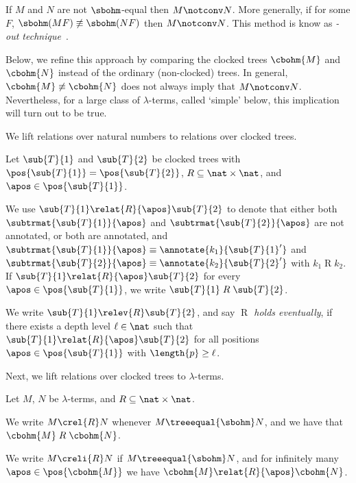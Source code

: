 If $M$ and $N$ are not $\sbohm$-equal then $M \notconv N$.
More generally, if for some $F$, 
$\sbohm(M F) \not\equiv \sbohm(N F)$ then $M \notconv N$.
This method is know as \emph{\bohm-out technique}~\cite{bare:1984}.

Below, we refine this approach by comparing
the clocked \bohm{} trees $\cbohm{M}$ and $\cbohm{N}$
instead of the ordinary (non-clocked) \boehm{} trees.
In general, $\cbohm{M} \not\equiv \cbohm{N}$
does not always imply that $M \notconv N$.
Nevertheless, for a large class of $\lambda$-terms, called `simple' below,
this implication will turn out to be true.


We lift relations over natural numbers to relations over clocked \boehm{} trees.

\newcommand{\scbt}{T}
\newcommand{\cbt}{\sub{\scbt}}
\newcommand{\acbt}{\cbt{1}}
\newcommand{\bcbt}{\cbt{2}}

\begin{definition}
  Let $\acbt$ and $\bcbt$ be clocked \boehm{} trees
  with $\pos{\acbt} = \pos{\bcbt}$,
  ${\mathrel{R}} \subseteq \nat \times \nat$,
  and $\apos \in \pos{\acbt}$.

  We use $\acbt \relat{\mathrel{R}}{\apos} \bcbt$ to denote that either
  both $\subtrmat{\acbt}{\apos}$ and $\subtrmat{\bcbt}{\apos}$ are not annotated,
  or 
  both are annotated, and
  $\subtrmat{\acbt}{\apos} \equiv \annotate{k_1}{\acbt'}$
  and $\subtrmat{\bcbt}{\apos} \equiv \annotate{k_2}{\bcbt'}$
  with $k_1 \mathrel{R} k_2$.
  If $\acbt \relat{\mathrel{R}}{\apos} \bcbt$ for every $\apos \in \pos{\acbt}$, 
  we write $\acbt \mathrel{R} \bcbt$.



  We write $\acbt \relev{\mathrel{R}} \bcbt$, and say \emph{$\mathrel{R}$ holds eventually},
  if there exists a depth level $\ell \in \nat$
  such that  $\acbt \relat{\mathrel{R}}{\apos} \bcbt$ for all positions $\apos \in \pos{\acbt}$ with $\length{p} \ge \ell$.
\end{definition}

Next, we lift relations over clocked \bohm{} trees to $\lambda$-terms.
\begin{definition}
  Let $M$, $N$ be $\lambda$-terms, and ${\mathrel{R}} \subseteq \nat \times \nat$.

  We write $M \crel{\mathrel{R}} N$ whenever $M \treeequal{\sbohm} N$,
  and we have that $\cbohm{M} \mathrel{R} \cbohm{N}$.
  
  We write $M \creli{\mathrel{R}} N$ if $M \treeequal{\sbohm} N$,
  and for infinitely many $\apos \in \pos{\cbohm{M}}$ we have
  $\cbohm{M} \relat{\mathrel{R}}{\apos} \cbohm{N}$.
\end{definition}



